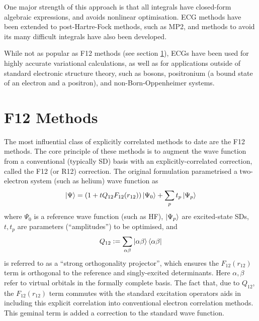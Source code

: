 One major strength of this approach is that all integrals have closed-form algebraic expressions,\cite{lesterGaussian1964} and avoids nonlinear optimisation.\cite{bukowskiNew1994,perssonAccurate1996} \Gls{ECG} methods have been extended to post-Hartre-Fock methods, such as MP2\cite{panGaussian1970,panElectron1972}, and methods to avoid its many difficult integrals have also been developed.\cite{szalewiczNew1982,szalewiczAtomic1983,wenzelAtomic1986,szalewiczAtomic1984,tewWeak2007}

While not as popular as F12 methods (see section \ref{sec:f12}), \glspl{ECG} have been used for highly accurate variational calculations,\cite{korobovCoulomb2000} as well as for applications outside of standard electronic structure theory, such as bosons,\cite{vargaPrecise1995} positronium (a bound state of an electron and a positron),\cite{bubinGroundstate2011} and non-Born-Oppenheimer systems.\cite{stankeNonBornOppenheimer2009}

\section{F12 Methods}
\label{sec:f12}

The most influential class of explicitly correlated methods to date are the F12 methods. The core principle of these methods is to augment the wave function from a conventional (typically \gls{SD}) basis with an explicitly-correlated correction, called the F12 (or R12) correction. The original formulation parametrised a two-electron system (such as helium) wave function as
\begin{equation}
    \label{eq:first-r12}
    \ket\Psi = (1+tQ_{12}F_{12}(r_{12}))\ket{\Psi_0}+\sum_{p}t_{p}\ket{\Psi_{p}}
\end{equation}
where $\Psi_0$ is a reference wave function (such as \gls{HF}), $\ket{\Psi_{p}}$ are excited-state \glspl{SD}, $t,t_{p}$ are parameters (``amplitudes'') to be optimised, and
\begin{equation}
    Q_{12} \mathrel{\mathop:}= \sum_{\alpha\beta}\ket{\alpha\beta}\bra{\alpha\beta}
\end{equation}
is referred to as a ``strong orthogonality projector'', which ensures the $F_{12}(r_{12})$ term is orthogonal to the reference and singly-excited determinants.
Here $\alpha,\beta$ refer to virtual orbitals in the formally complete basis. The fact that, due to $Q_{12}$, the $F_{12}(r_{12})$ term commutes with the standard excitation operators aids in including this explicit correlation into conventional electron correlation methods. This geminal term is added a correction to the standard wave function.

